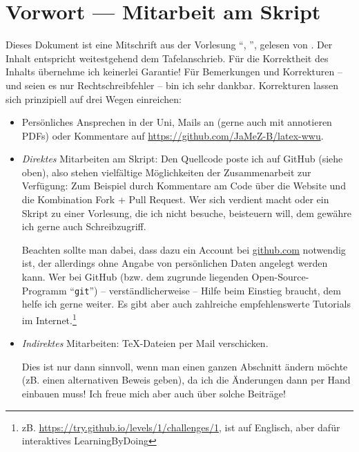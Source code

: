 \section*{Vorwort --- Mitarbeit am Skript}
Dieses Dokument ist eine Mitschrift aus der Vorlesung \enquote{\fach, \semester}, gelesen von \prof. Der Inhalt entspricht weitestgehend dem Tafelanschrieb. Für die
Korrektheit des Inhalts übernehme ich keinerlei Garantie! Für Bemerkungen und Korrekturen -- und seien es nur Rechtschreibfehler -- bin ich sehr dankbar. 
Korrekturen lassen sich prinzipiell auf drei Wegen einreichen: 
\begin{itemize}
	\item Persönliches Ansprechen in der Uni, Mails an  (gerne auch mit annotieren PDFs) oder Kommentare auf \url{https://github.com/JaMeZ-B/latex-wwu}.
	\item \emph{Direktes} Mitarbeiten am Skript: Den Quellcode poste ich auf GitHub (siehe oben), also stehen vielfältige Möglichkeiten der Zusammenarbeit zur Verfügung:
	Zum Beispiel durch Kommentare am Code über die Website und die Kombination Fork + Pull Request. Wer sich verdient macht oder ein Skript zu einer Vorlesung, die 
	ich nicht besuche, beisteuern will, dem gewähre ich gerne auch Schreibzugriff.
	
	Beachten sollte man dabei, dass dazu ein Account bei \url{github.com} notwendig ist, der allerdings ohne Angabe von persönlichen Daten angelegt werden kann. 
	Wer bei GitHub (bzw. dem zugrunde liegenden Open-Source-Programm \enquote{\texttt{git}}) -- verständlicherweise -- Hilfe beim Einstieg braucht, dem helfe ich gerne 
	weiter. Es gibt aber auch zahlreiche empfehlenswerte Tutorials im Internet.\footnote{zB. \url{https://try.github.io/levels/1/challenges/1}, ist auf Englisch, aber dafür 
	interaktives LearningByDoing}
	\item \emph{Indirektes} Mitarbeiten: \TeX-Dateien per Mail verschicken. 
	
	Dies ist nur dann sinnvoll, wenn man einen ganzen Abschnitt ändern möchte (zB. einen alternativen Beweis geben), da ich die Änderungen dann per Hand einbauen muss! Ich freue mich aber auch über solche Beiträge!
\end{itemize}